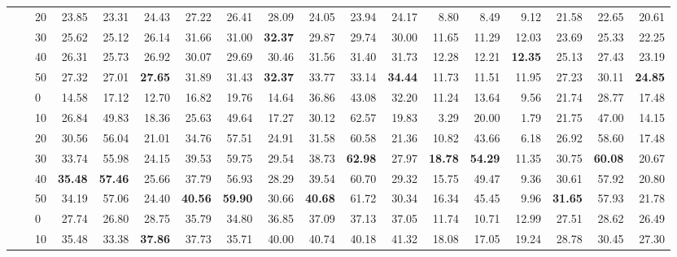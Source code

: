 \begin{table*}[!h]
{\begin{tabular}{lllrrr|rrr|rrr|rrr|rrr}
 \textbf{} & \textbf{} & 20 & 23.85 & 23.31 & 24.43 & 27.22 & 26.41 & 28.09 & 24.05 & 23.94 & 24.17 & 8.80 & 8.49 & 9.12 & 21.58 & 22.65 & 20.61 \\ 
 \textbf{} & \textbf{} & 30 & 25.62 & 25.12 & 26.14 & 31.66 & 31.00 & \textbf{32.37} & 29.87 & 29.74 & 30.00 & 11.65 & 11.29 & 12.03 & 23.69 & 25.33 & 22.25 \\ 
 \textbf{} & \textbf{} & 40 & 26.31 & 25.73 & 26.92 & 30.07 & 29.69 & 30.46 & 31.56 & 31.40 & 31.73 & 12.28 & 12.21 & \textbf{12.35} & 25.13 & 27.43 & 23.19 \\ 
 \textbf{} & \textbf{} & 50 & 27.32 & 27.01 & \textbf{27.65} & 31.89 & 31.43 & \textbf{32.37} & 33.77 & 33.14 & \textbf{34.44} & 11.73 & 11.51 & 11.95 & 27.23 & 30.11 & \textbf{24.85} \\ 
 \arrayrulecolor{gray}\cline{2-18}\arrayrulecolor{black}
\textbf{} & \textbf{\multirow{6}{*}{SC}} & 0 & 14.58 & 17.12 & 12.70 & 16.82 & 19.76 & 14.64 & 36.86 & 43.08 & 32.20 & 11.24 & 13.64 & 9.56 & 21.74 & 28.77 & 17.48 \\ 
 \textbf{} & \textbf{} & 10 & 26.84 & 49.83 & 18.36 & 25.63 & 49.64 & 17.27 & 30.12 & 62.57 & 19.83 & 3.29 & 20.00 & 1.79 & 21.75 & 47.00 & 14.15 \\ 
 \textbf{} & \textbf{} & 20 & 30.56 & 56.04 & 21.01 & 34.76 & 57.51 & 24.91 & 31.58 & 60.58 & 21.36 & 10.82 & 43.66 & 6.18 & 26.92 & 58.60 & 17.48 \\ 
 \textbf{} & \textbf{} & 30 & 33.74 & 55.98 & 24.15 & 39.53 & 59.75 & 29.54 & 38.73 & \textbf{62.98} & 27.97 & \textbf{18.78} & \textbf{54.29} & 11.35 & 30.75 & \textbf{60.08} & 20.67 \\ 
 \textbf{} & \textbf{} & 40 & \textbf{35.48} & \textbf{57.46} & 25.66 & 37.79 & 56.93 & 28.29 & 39.54 & 60.70 & 29.32 & 15.75 & 49.47 & 9.36 & 30.61 & 57.92 & 20.80 \\ 
 \textbf{} & \textbf{} & 50 & 34.19 & 57.06 & 24.40 & \textbf{40.56} & \textbf{59.90} & 30.66 & \textbf{40.68} & 61.72 & 30.34 & 16.34 & 45.45 & 9.96 & \textbf{31.65} & 57.93 & 21.78 \\ 
\hline
\arrayrulecolor{gray}\cline{2-18}\arrayrulecolor{black}
\textbf{\multirow{12}{*}{Gemma-2-27B}} & \textbf{\multirow{6}{*}{-}} & 0 & 27.74 & 26.80 & 28.75 & 35.79 & 34.80 & 36.85 & 37.09 & 37.13 & 37.05 & 11.74 & 10.71 & 12.99 & 27.51 & 28.62 & 26.49 \\ 
 \textbf{} & \textbf{} & 10 & 35.48 & 33.38 & \textbf{37.86} & 37.73 & 35.71 & 40.00 & 40.74 & 40.18 & 41.32 & 18.08 & 17.05 & 19.24 & 28.78 & 30.45 & 27.30 \\ 

\end{tabular}}
\end{table*}
